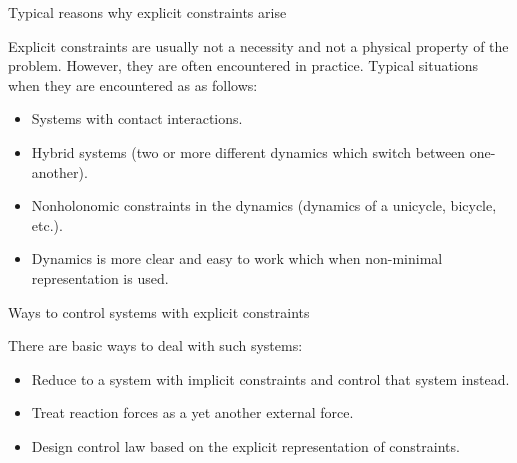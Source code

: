 \documentclass{beamer}
\begin{document}
\begin{frame}{Typical reasons why explicit constraints arise}
\begin{flushleft}

Explicit constraints are usually not a necessity and not a physical property of the problem. However, they are often encountered in practice. Typical situations when they are encountered as as follows:

\begin{itemize}
    \item Systems with contact interactions.
    \item Hybrid systems (two or more different dynamics which switch between one-another).
    \item Nonholonomic constraints in the dynamics (dynamics of a unicycle, bicycle, etc.).
    \item Dynamics is more clear and easy to work which when non-minimal representation is used.
\end{itemize}

\end{flushleft}
\end{frame}


\begin{frame}{Ways to control systems with explicit constraints}
\begin{flushleft}

There are basic ways to deal with such systems:

\begin{itemize}
    \item Reduce to a system with implicit constraints and control that system instead.
    \item Treat reaction forces as a yet another external force.
    \item Design control law based on the explicit representation of constraints.
\end{itemize}

\end{flushleft}
\end{frame}
\end{document}
